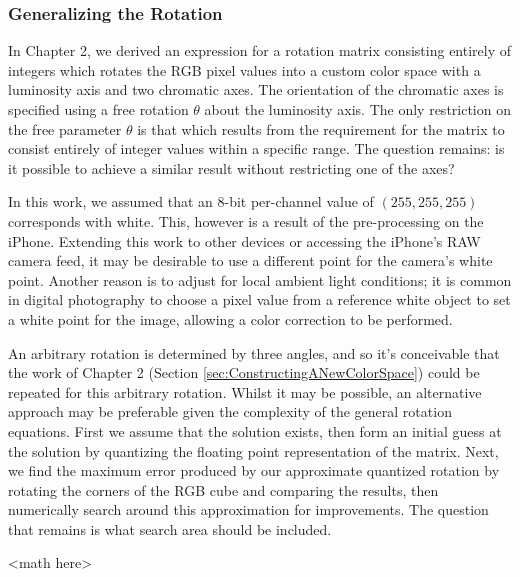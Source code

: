\subsubsection{Generalizing the Rotation}\label{sec:GeneralizingTheRotation}
In Chapter 2, we derived an expression for a rotation matrix consisting entirely of integers which rotates the RGB pixel values into a custom color space with a luminosity axis and two chromatic axes. The orientation of the chromatic axes is specified using a free rotation $\theta$ about the luminosity axis. The only restriction on the free parameter $\theta$ is that which results from the requirement for the matrix to consist entirely of integer values within a specific range. The question remains: is it possible to achieve a similar result without restricting one of the axes?

In this work, we assumed that an 8-bit per-channel value of $(255, 255, 255)$ corresponds with white. This, however is a result of the pre-processing on the iPhone. Extending this work to other devices or accessing the iPhone's RAW camera feed, it may be desirable to use a different point for the camera's white point. Another reason is to adjust for local ambient light conditions; it is common in digital photography to choose a pixel value from a reference white object to set a white point for the image, allowing a color correction to be performed.

An arbitrary rotation is determined by three angles, and so it's conceivable that the work of Chapter 2 (Section \ref{sec:ConstructingANewColorSpace}) could be repeated for this arbitrary rotation. Whilst it may be possible, an alternative approach may be preferable given the complexity of the general rotation equations. First we assume that the solution exists, then form an initial guess at the solution by quantizing the floating point representation of the matrix. Next, we find the maximum error produced by our approximate quantized rotation by rotating the corners of the RGB cube and comparing the results, then numerically search around this approximation for improvements. The question that remains is what search area should be included.

<math here>


